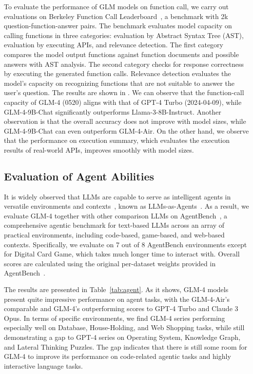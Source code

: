 To evaluate the performance of GLM models on function call, we carry out evaluations on Berkeley Function Call Leaderboard~\cite{berkeley-function-calling-leaderboard}, a benchmark with 2k question-function-answer pairs. The benchmark evaluates model capacity on calling functions in three categories: evaluation by Abstract Syntax Tree (AST), evaluation by executing APIs, and relevance detection. The first category compares the model output functions against function documents and possible answers with AST analysis. The second category checks for response correctness by executing the generated function calls. Relevance detection evaluates the model's capacity on recognizing functions that are not suitable to answer the user's question. 
The results are shown in . We can observe that the function-call capacity of  GLM-4 (0520) aligns with that of GPT-4 Turbo (2024-04-09), while GLM-4-9B-Chat significantly outperforms Llama-3-8B-Instruct. Another observation is that the overall accuracy does not improve with model sizes, while GLM-4-9B-Chat can even outperform GLM-4-Air. 
On the other hand, we observe that the performance on execution summary, which evaluates the execution results of real-world APIs, improves smoothly with model sizes.



\subsection{Evaluation of Agent Abilities}


It is widely observed that LLMs are capable to serve as intelligent agents in versatile environments and contexts~\cite{park2023generative,yao2022react}, known as LLMs-as-Agents~\cite{liu2023agentbench}.
As a result, we evaluate GLM-4 together with other comparison LLMs on AgentBench~\cite{liu2023agentbench}, a comprehensive agentic benchmark for text-based LLMs across an array of practical environments, including code-based, game-based, and web-based contexts.
Specifically, we evaluate on 7 out of 8 AgentBench environments except for Digital Card Game, which takes much longer time to interact with.
Overall scores are calculated using the original per-dataset weights provided in AgentBench~\cite{liu2023agentbench}.



The results are presented in Table~\ref{tab:agent}.
As it shows, GLM-4 models present quite impressive performance on agent tasks, with the GLM-4-Air's comparable and GLM-4's outperforming scores to GPT-4 Turbo and Claude 3 Opus.
In terms of specific environments, we find GLM-4 series performing especially well on Database, House-Holding, and Web Shopping tasks, while still demonstrating a gap to GPT-4 series on Operating System, Knowledge Graph, and Lateral Thinking Puzzles.
The gap indicates that there is still some room for GLM-4 to improve its performance on code-related agentic tasks and highly interactive language tasks.

